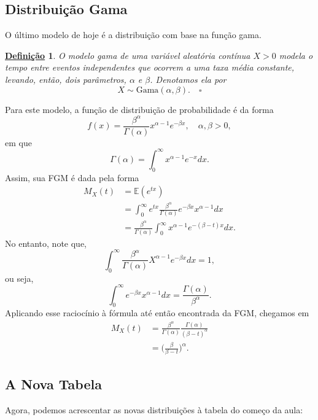 \documentclass{article}
\newtheorem*{def*}{\underline{Defini\c c\~ao}}
\begin{document}
\subsection{Distribuição Gama}
  O último modelo de hoje é a distribuição com base na função gama.
 \begin{def*}
  O \textit{modelo gama} de uma variável aleatória contínua \(X > 0\) modela o tempo entre eventos independentes
que ocorrem a uma taxa média constante, levando, então, dois parâmetros, \(\alpha\) e \(\beta \).
Denotamos ela por 
  \[
    X\sim \mathrm{Gama}(\alpha , \beta ).\quad\square
  \]
 \end{def*}
 Para este modelo, a função de distribuição de probabilidade é da forma 
  \[
    f(x) = \frac{\beta^{\alpha }}{\Gamma (\alpha )}x^{\alpha -1}e^{-\beta x},\quad \alpha , \beta > 0,
  \]
  em que 
  \[
    \Gamma (\alpha ) = \int_{0}^{\infty}x^{\alpha -1}e^{-x }dx.
  \]
  Assim, sua FGM é dada pela forma
 \begin{align*}
   M_{X}(t) &= \mathbb{E}(e^{tx})\\
            &= \int_{0}^{\infty}e^{tx}\frac{\beta ^{\alpha }}{\Gamma (\alpha )}e^{-\beta x}x^{\alpha -1}dx\\
            &= \frac{\beta ^{\alpha }}{\Gamma (\alpha )}\int_{0}^{\infty}x^{\alpha -1}e^{-(\beta -t)x}dx.
 \end{align*}
 No entanto, note que, 
  \[
    \int_{0}^{\infty} \frac{\beta ^{\alpha }}{\Gamma (\alpha )}X^{\alpha -1}e^{-\beta x}dx = 1,
  \]
  ou seja, 
  \[
    \int_{0}^{\infty}e^{-\beta x}x^{\alpha -1}dx = \frac{\Gamma (\alpha )}{\beta^{\alpha } }.
  \]
  Aplicando esse raciocínio à fórmula até então encontrada da FGM, chegamos em 
\begin{align*}
  M_{X}(t) &= \frac{\beta ^{\alpha }}{\Gamma (\alpha )}\frac{\Gamma (\alpha )}{(\beta - t)^{\alpha }} \\
           &= \biggl(\frac{\beta }{\beta -t}\biggr)^{\alpha }.
\end{align*}
\subsection{A Nova Tabela}
  Agora, podemos acrescentar as novas distribuições à tabela do começo da aula:
\end{document}
